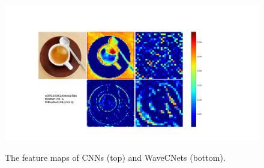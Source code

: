 \begin{figure}[!bpt]
	{\includegraphics*[scale=0.25, viewport=175 65 1025 575]{figures/feature_map_clean/00041584_WResNet101.pdf}}\hspace{30pt}
	\caption{The feature maps of CNNs (top) and WaveCNets (bottom).}
	\label{fig_feature_maps_more_1}
\end{figure}

